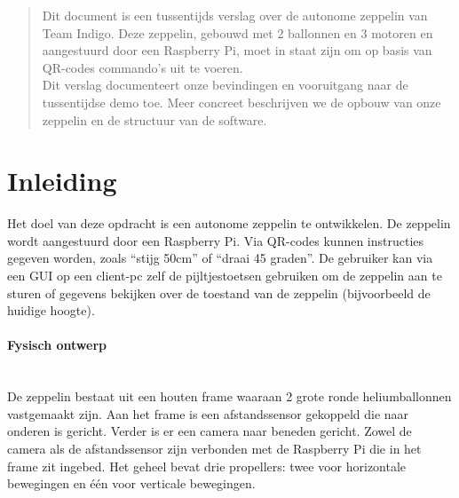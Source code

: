 \documentclass[eind]{penoverslag}
\begin{document}
\maketitlepage


\begin{abstract}
\noindent
Dit document is een tussentijds verslag over de autonome zeppelin van Team Indigo. Deze zeppelin, gebouwd met 2 ballonnen en 3 motoren en aangestuurd door een Raspberry Pi, moet in staat zijn om op basis van QR-codes commando's uit te voeren.\\
Dit verslag documenteert onze bevindingen en vooruitgang naar de tussentijdse demo toe. Meer concreet beschrijven we de opbouw van onze zeppelin en de structuur van de software.
\end{abstract}


\tableofcontents\newpage


\section{Inleiding}
Het doel van deze opdracht is een autonome zeppelin te ontwikkelen. De zeppelin wordt aangestuurd door een Raspberry Pi. Via QR-codes kunnen instructies gegeven worden, zoals ``stijg 50cm'' of ``draai 45   graden''. De gebruiker kan via een GUI op een client-pc zelf de pijltjestoetsen gebruiken om de zeppelin aan te sturen of gegevens bekijken over de toestand van de zeppelin (bijvoorbeeld de huidige hoogte).

\paragraph{Fysisch ontwerp}
~\\ 
De zeppelin bestaat uit een houten frame waaraan 2 grote ronde heliumballonnen vastgemaakt zijn. Aan het frame is een afstandssensor gekoppeld die naar onderen is gericht. Verder is er een camera naar beneden gericht. Zowel de camera als de afstandssensor zijn verbonden met de Raspberry Pi die in het frame zit ingebed. Het geheel bevat drie propellers: twee voor horizontale bewegingen en \'{e}\'{e}n voor verticale bewegingen.
\end{document}
